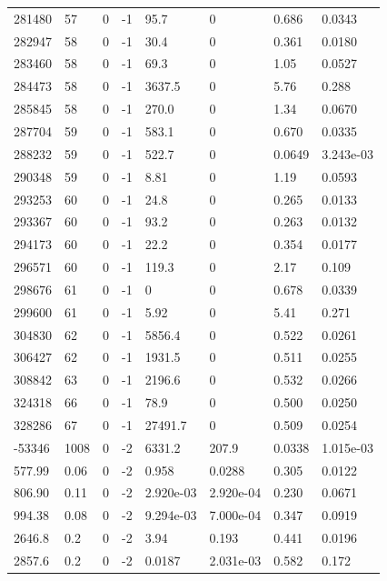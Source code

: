 \documentclass[preview]{standalone}
\begin{document}
{{{{{{\begin{tabular}{L{1.2cm}C{1.2cm} C{0.3cm}C{0.5cm} C{1.4cm}C{1.4cm} C{1.4cm}C{1.4cm}}
  281480  &    57  & 0     & -1 &  95.7  & 0  & 0.686 &  0.0343   \\ 
  282947  &    58  & 0     & -1 &  30.4  & 0  & 0.361 &  0.0180   \\ 
  283460  &    58  & 0     & -1 &  69.3  & 0  & 1.05 &  0.0527   \\ 
  284473  &    58  & 0     & -1 &  3637.5  & 0  & 5.76 &  0.288   \\ 
  285845  &    58  & 0     & -1 &  270.0  & 0  & 1.34 &  0.0670   \\ 
  287704  &    59  & 0     & -1 &  583.1  & 0  & 0.670 &  0.0335   \\ 
  288232  &    59  & 0     & -1 &  522.7  & 0  & 0.0649 &  3.243e-03   \\ 
  290348  &    59  & 0     & -1 &  8.81  & 0  & 1.19 &  0.0593   \\ 
  293253  &    60  & 0     & -1 &  24.8  & 0  & 0.265 &  0.0133   \\ 
  293367  &    60  & 0     & -1 &  93.2  & 0  & 0.263 &  0.0132   \\ 
  294173  &    60  & 0     & -1 &  22.2  & 0  & 0.354 &  0.0177   \\ 
  296571  &    60  & 0     & -1 &  119.3  & 0  & 2.17 &  0.109   \\ 
  298676  &    61  & 0     & -1 &  0  & 0  & 0.678 &  0.0339   \\ 
  299600  &    61  & 0     & -1 &  5.92  & 0  & 5.41 &  0.271   \\ 
  304830  &    62  & 0     & -1 &  5856.4  & 0  & 0.522 &  0.0261   \\ 
  306427  &    62  & 0     & -1 &  1931.5  & 0  & 0.511 &  0.0255   \\ 
  308842  &    63  & 0     & -1 &  2196.6  & 0  & 0.532 &  0.0266   \\ 
  324318  &    66  & 0     & -1 &  78.9  & 0  & 0.500 &  0.0250   \\ 
  328286  &    67  & 0     & -1 &  27491.7  & 0  & 0.509 &  0.0254   \\ 
  -53346  &  1008  & 0     & -2 &  6331.2  & 207.9  & 0.0338 &  1.015e-03   \\ 
  577.99  &  0.06  & 0     & -2 &  0.958  & 0.0288  & 0.305 &  0.0122   \\ 
  806.90  &  0.11  & 0     & -2 &  2.920e-03  & 2.920e-04  & 0.230 &  0.0671   \\ 
  994.38  &  0.08  & 0     & -2 &  9.294e-03  & 7.000e-04  & 0.347 &  0.0919   \\ 
  2646.8  &   0.2  & 0     & -2 &  3.94  & 0.193  & 0.441 &  0.0196   \\ 
  2857.6  &   0.2  & 0     & -2 &  0.0187  & 2.031e-03  & 0.582 &  0.172   \\ 
\hline 
\end{tabular} 

}}}}}}
\end{document}
